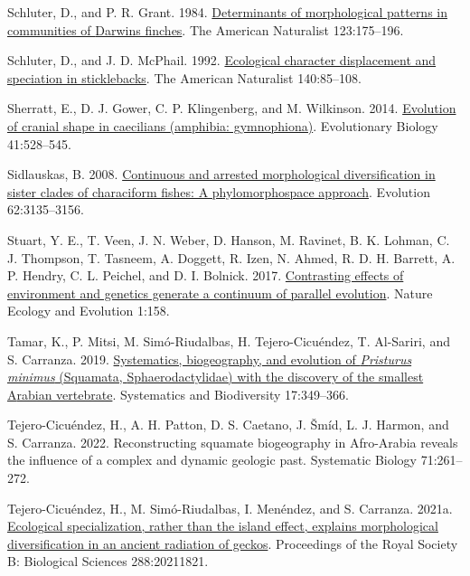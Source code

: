 \documentclass[
  11pt,
]{article}
\newlength{\cslhangindent}
\newlength{\cslentryspacingunit} %
\newenvironment{CSLReferences}[2] %
 {%
  \setlength{\parindent}{0pt}
  \ifodd #1
  \let\oldpar\par
  \def\par{\hangindent=\cslhangindent\oldpar}
  \fi
  \setlength{\parskip}{#2\cslentryspacingunit}
 }%
 {}
\begin{document}
\begin{CSLReferences}{1}{0}
\leavevmode{}%
Schluter, D., and P. R. Grant. 1984.
\href{https://doi.org/10.1086/284196}{Determinants of morphological
patterns in communities of {D}arwin{\textquotesingle}s finches}. The
American Naturalist 123:175--196.

\leavevmode{}%
Schluter, D., and J. D. McPhail. 1992.
\href{https://doi.org/10.1086/285404}{Ecological character displacement
and speciation in sticklebacks}. The American Naturalist 140:85--108.

\leavevmode{}%
Sherratt, E., D. J. Gower, C. P. Klingenberg, and M. Wilkinson. 2014.
\href{https://doi.org/10.1007/s11692-014-9287-2}{Evolution of cranial
shape in caecilians (amphibia: gymnophiona)}. Evolutionary Biology
41:528--545.

\leavevmode{}%
Sidlauskas, B. 2008.
\href{https://doi.org/10.1111/j.1558-5646.2008.00519.x}{Continuous and
arrested morphological diversification in sister clades of characiform
fishes: A phylomorphospace approach}. Evolution 62:3135--3156.

\leavevmode{}%
Stuart, Y. E., T. Veen, J. N. Weber, D. Hanson, M. Ravinet, B. K.
Lohman, C. J. Thompson, T. Tasneem, A. Doggett, R. Izen, N. Ahmed, R. D.
H. Barrett, A. P. Hendry, C. L. Peichel, and D. I. Bolnick. 2017.
\href{https://doi.org/10.1038/s41559-017-0158}{Contrasting effects of
environment and genetics generate a continuum of parallel evolution}.
Nature Ecology and Evolution 1:158.

\leavevmode{}%
Tamar, K., P. Mitsi, M. Simó-Riudalbas, H. Tejero-Cicuéndez, T.
Al-Sariri, and S. Carranza. 2019.
\href{https://doi.org/10.1080/14772000.2019.1614694}{Systematics,
biogeography, and evolution of \emph{{P}risturus minimus} ({S}quamata,
{S}phaerodactylidae) with the discovery of the smallest {A}rabian
vertebrate}. Systematics and Biodiversity 17:349--366.

\leavevmode{}%
Tejero-Cicuéndez, H., A. H. Patton, D. S. Caetano, J. Šmíd, L. J.
Harmon, and S. Carranza. 2022. Reconstructing squamate biogeography in
{A}fro-{A}rabia reveals the influence of a complex and dynamic geologic
past. Systematic Biology 71:261--272.

\leavevmode{}%
Tejero-Cicuéndez, H., M. Simó-Riudalbas, I. Menéndez, and S. Carranza.
2021a. \href{https://doi.org/10.1098/rspb.2021.1821}{Ecological
specialization, rather than the island effect, explains morphological
diversification in an ancient radiation of geckos}. Proceedings of the
Royal Society B: Biological Sciences 288:20211821.


\end{CSLReferences}
\end{document}
